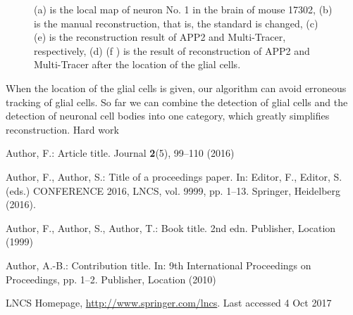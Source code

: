 \documentclass[runningheads]{llncs}
\begin{document}
\begin{figure}[htbp]

	
	
	\caption{(a) is the local map of neuron No. 1 in the brain of mouse 17302, (b) is the manual reconstruction, that is, the standard is changed, (c) (e) is the reconstruction result of APP2 and Multi-Tracer, respectively, (d) (f ) is the result of reconstruction of APP2 and Multi-Tracer after the location of the glial cells.}
\end{figure}

When the location of the glial cells is given, our algorithm can avoid erroneous tracking of glial cells. So far we can combine the detection of glial cells and the detection of neuronal cell bodies into one category, which greatly simplifies reconstruction. Hard work


%
%
%
% 
% 
%
\begin{thebibliography}{8}
Author, F.: Article title. Journal \textbf{2}(5), 99--110 (2016)

Author, F., Author, S.: Title of a proceedings paper. In: Editor,
F., Editor, S. (eds.) CONFERENCE 2016, LNCS, vol. 9999, pp. 1--13.
Springer, Heidelberg (2016). 

Author, F., Author, S., Author, T.: Book title. 2nd edn. Publisher,
Location (1999)

Author, A.-B.: Contribution title. In: 9th International Proceedings
on Proceedings, pp. 1--2. Publisher, Location (2010)

LNCS Homepage, \url{http://www.springer.com/lncs}. Last accessed 4
Oct 2017
\end{thebibliography}
\end{document}
